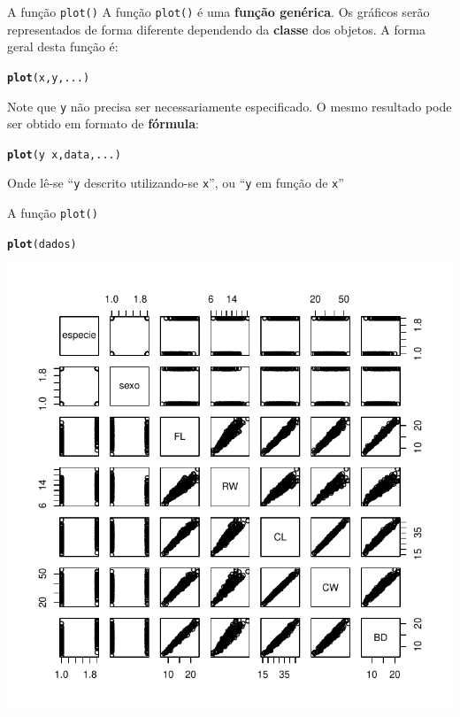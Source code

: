 \documentclass[10pt]{beamer}\usepackage[]{graphicx}\usepackage[]{color}
\makeatletter
\newcommand{\hlopt}[1]{\textcolor[rgb]{0,0,0}{#1}}%
\newcommand{\hlstd}[1]{\textcolor[rgb]{0.345,0.345,0.345}{#1}}%
\newcommand{\hlkwd}[1]{\textcolor[rgb]{0.282,0.239,0.545}{\textbf{#1}}}%
\newenvironment{kframe}{%
 \def\at@end@of@kframe{}%
 \ifinner\ifhmode%
  \def\at@end@of@kframe{\end{minipage}}%
  \begin{minipage}{\columnwidth}%
 \fi\fi%
 \def\FrameCommand##1{\hskip\@totalleftmargin \hskip-\fboxsep
 \colorbox{shadecolor}{##1}\hskip-\fboxsep
     \hskip-\linewidth \hskip-\@totalleftmargin \hskip\columnwidth}%
 \MakeFramed {\advance\hsize-\width
   \@totalleftmargin\z@ \linewidth\hsize
   \@setminipage}}%
 {\par\unskip\endMakeFramed%
 \at@end@of@kframe}
\newenvironment{knitrout}{}{} %
\makeatother
\begin{document}
\begin{frame}[fragile]{A função \texttt{plot()}}
A função \texttt{plot()} é uma \textbf{função genérica}. Os gráficos serão
representados de forma diferente dependendo da \textbf{classe} dos
objetos. A forma geral desta função é:
\begin{knitrout}\small
{}\color{fgcolor}\begin{kframe}
\begin{alltt}
\hlkwd{plot}\hlstd{(x, y, ...)}
\end{alltt}
\end{kframe}
\end{knitrout}

Note que \texttt{y} não precisa ser necessariamente especificado. O
mesmo resultado pode ser obtido em formato de \textbf{fórmula}:
\begin{knitrout}\small
{}\color{fgcolor}\begin{kframe}
\begin{alltt}
\hlkwd{plot}\hlstd{(y} \hlopt{~} \hlstd{x, data, ...)}
\end{alltt}
\end{kframe}
\end{knitrout}

Onde lê-se ``\texttt{y} descrito utilizando-se \texttt{x}'', ou
``\texttt{y} em função de \texttt{x}''
\end{frame}

\begin{frame}[fragile]{A função \texttt{plot()}}
\begin{knitrout}\small
{}\color{fgcolor}\begin{kframe}
\begin{alltt}
\hlkwd{plot}\hlstd{(dados)}
\end{alltt}
\end{kframe}

{\centering \includegraphics[width=.7\textwidth]{figure/unnamed-chunk-24} 

}



\end{knitrout}

\end{frame}
\end{document}
